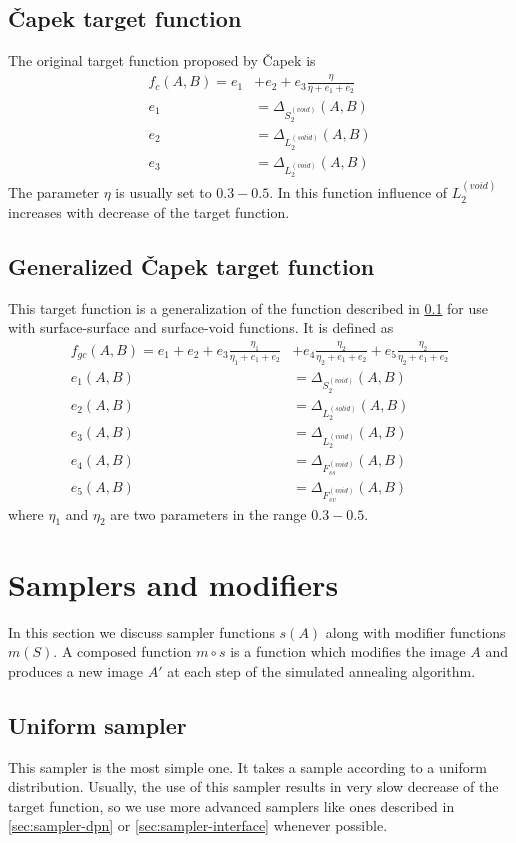\documentclass[preprint,amsmath,amssymb,aps,pre,nofootinbib]{revtex4-1}
\begin{document}
\subsection{Čapek target function}
\label{sec:target-čapek}
The original target function proposed by Čapek \cite{capek-target} is
\begin{align*}
  f_c(A, B) = e_1 & + e_2 + e_3 \frac{\eta}{\eta + e_1 + e_2} \\
  e_1 & = \Delta_{S^{(void)}_2}(A, B) \\
  e_2 & = \Delta_{L^{(solid)}_2}(A, B) \\
  e_3 & = \Delta_{L^{(void)}_2}(A, B)
\end{align*}
The parameter $\eta$ is usually set to $0.3-0.5$. In this function influence of
$L_2^{(void)}$ increases with decrease of the target function.

\subsection{Generalized Čapek target function}
\label{sec:target-čapek-general}
This target function is a generalization of the function described in
\cref{sec:target-čapek} for use with surface-surface and surface-void
functions. It is defined as
\begin{align*}
  f_{gc}(A, B) = e_1 + e_2 + e_3 \frac{\eta_1}{\eta_1 + e_1 + e_2} & + e_4
  \frac{\eta_2}{\eta_2 + e_1 + e_2} + e_5 \frac{\eta_2}{\eta_2 + e_1 + e_2} \\
  e_1(A, B) & = \Delta_{S^{(void)}_2}(A, B) \\
  e_2(A, B) & = \Delta_{L^{(solid)}_2}(A, B) \\
  e_3(A, B) & = \Delta_{L^{(void)}_2}(A, B) \\
  e_4(A, B) & = \Delta_{F^{(void)}_{ss}}(A, B) \\
  e_5(A, B) & = \Delta_{F^{(void)}_{sv}}(A, B)
\end{align*}
where $\eta_1$ and $\eta_2$ are two parameters in the range $0.3-0.5$.

\section{Samplers and modifiers}
\label{sec:samplers-mods}
In this section we discuss sampler functions $s(A)$ along with modifier
functions $m(S)$. A composed function $m \circ s$ is a function which modifies
the image $A$ and produces a new image $A'$ at each step of the simulated
annealing algorithm. 
\subsection{Uniform sampler}
\label{sec:sampler-uniform}
This sampler is the most simple one. It takes a sample according to a uniform
distribution. Usually, the use of this sampler results in very slow decrease of
the target function, so we use more advanced samplers like ones described in
\cref{sec:sampler-dpn} or \cref{sec:sampler-interface} whenever possible.
\end{document}
